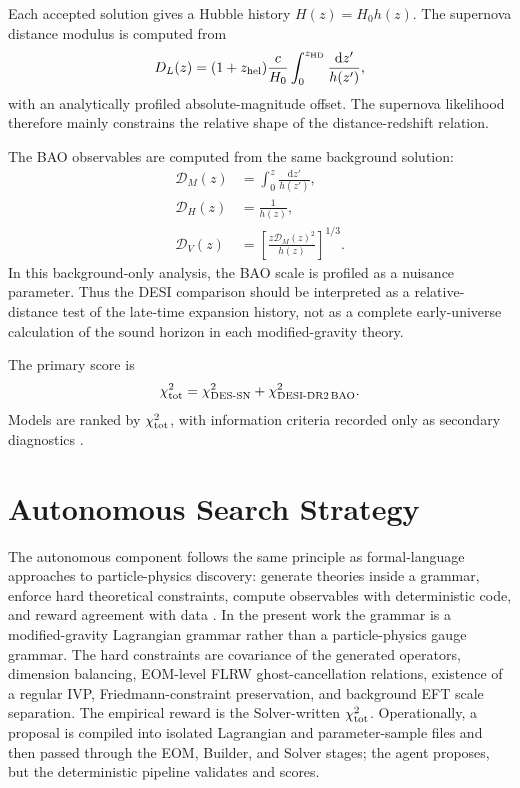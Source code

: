 \documentclass[aps,prd,twocolumn,superscriptaddress,nofootinbib,longbibliography]{revtex4-2}
\newcommand{\dd}{\mathrm{d}}
\newcommand{\calD}{\mathcal{D}}
\newcommand{\DES}{\mathrm{DES}}
\newcommand{\DESI}{\mathrm{DESI}}
\newcommand{\SN}{\mathrm{SN}}
\newcommand{\BAO}{\mathrm{BAO}}
\newcommand{\chiT}{\chi^2_{\rm tot}}
\begin{document}
Each accepted solution gives a Hubble history $H(z)=H_0h(z)$.  The supernova distance modulus is computed from
\begin{equation}
D_L(z)=(1+z_{\rm hel})\frac{c}{H_0}
\int_0^{z_{\rm HD}}\frac{\dd z'}{h(z')},
\label{eq:luminosity-distance}
\end{equation}
with an analytically profiled absolute-magnitude offset.  The supernova likelihood therefore mainly constrains the relative shape of the distance-redshift relation.

The BAO observables are computed from the same background solution:
\begin{align}
\calD_M(z)&=\int_0^z\frac{\dd z'}{h(z')},\\
\calD_H(z)&=\frac{1}{h(z)},\\
\calD_V(z)&=\left[\frac{z\calD_M(z)^2}{h(z)}\right]^{1/3}.
\label{eq:bao}
\end{align}
In this background-only analysis, the BAO scale is profiled as a nuisance parameter.  Thus the DESI comparison should be interpreted as a relative-distance test of the late-time expansion history, not as a complete early-universe calculation of the sound horizon in each modified-gravity theory.

The primary score is
\begin{equation}
\chiT=\chi^2_{\DES\text{-}\SN}+\chi^2_{\DESI\text{-DR2}\,\BAO}.
\label{eq:chi2}
\end{equation}
Models are ranked by $\chiT$, with information criteria recorded only as secondary diagnostics \cite{Akaike1974,Schwarz1978}.

\section{Autonomous Search Strategy}
\label{sec:search}

The autonomous component follows the same principle as formal-language approaches to particle-physics discovery: generate theories inside a grammar, enforce hard theoretical constraints, compute observables with deterministic code, and reward agreement with data \cite{Alexander2026Albert}.  In the present work the grammar is a modified-gravity Lagrangian grammar rather than a particle-physics gauge grammar.  The hard constraints are covariance of the generated operators, dimension balancing, EOM-level FLRW ghost-cancellation relations, existence of a regular IVP, Friedmann-constraint preservation, and background EFT scale separation.  The empirical reward is the Solver-written $\chiT$.  Operationally, a proposal is compiled into isolated Lagrangian and parameter-sample files and then passed through the EOM, Builder, and Solver stages; the agent proposes, but the deterministic pipeline validates and scores.
\end{document}
